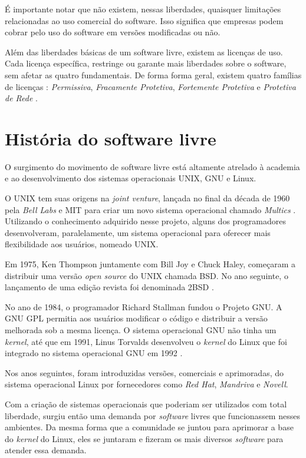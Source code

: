 É importante notar que não existem, nessas liberdades, quaisquer limitações relacionadas ao uso comercial do software. Isso significa que empresas podem cobrar pelo uso do software em versões modificadas ou não.

Além das liberdades básicas de um software livre, existem as licenças de uso. Cada licença específica, restringe ou garante mais liberdades sobre o software, sem afetar as quatro fundamentais. De forma forma geral, existem quatro famílias de licenças : \textit{Permissiva},  \textit{Fracamente Protetiva},  \textit{Fortemente Protetiva} e \textit{Protetiva de Rede} \cite{Williams}. 

\section{História do software livre}
O surgimento do movimento de software livre está altamente atrelado à academia e ao desenvolvimento dos sistemas operacionais UNIX, GNU e Linux.

O UNIX tem suas origens na \textit{joint venture}, lançada no final da década de 1960 pela \textit{Bell Labs} e MIT para criar um novo sistema operacional chamado \textit{Multics} \cite{tozzi2017fun}. Utilizando o conhecimento adquirido nesse projeto, alguns dos programadores desenvolveram, paralelamente, um sistema operacional para oferecer mais flexibilidade aos usuários, nomeado UNIX. 

Em 1975, Ken Thompson juntamente com Bill Joy e Chuck Haley, começaram a distribuir uma versão \textit{open source} do UNIX chamada BSD. No ano seguinte, o lançamento de uma edição revista foi denominada 2BSD \cite{tozzi2017fun}.

No ano de 1984, o programador Richard Stallman fundou o Projeto GNU. A GNU GPL permitia aos usuários modificar o código e distribuir a versão melhorada sob a mesma licença. O sistema operacional GNU não tinha um \textit{kernel}, até que em 1991, Linus Torvalds desenvolveu o \textit{kernel} do Linux que foi integrado no sistema operacional GNU em 1992 \cite{tozzi2017fun}.

Nos anos seguintes, foram introduzidas versões, comerciais e aprimoradas, do sistema operacional Linux por fornecedores como \textit{Red Hat}, \textit{Mandriva} e \textit{Novell}.

Com a criação de sistemas operacionais que poderiam ser utilizados com total liberdade, surgiu então uma demanda por \textit{software} livres que funcionassem nesses ambientes. Da mesma forma que a comunidade se juntou para aprimorar a base do \textit{kernel} do Linux, eles se juntaram e fizeram os mais diversos \textit{software} para atender essa demanda. 

